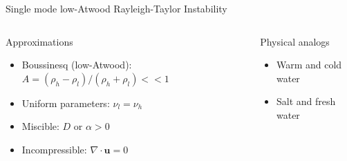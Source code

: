 \documentclass[12pt]{beamer}
\begin{document}
\begin{frame}{Single mode low-Atwood Rayleigh-Taylor Instability}
\begin{columns}[c]

\begin{block}{Approximations}
\begin{itemize}
	\item Boussinesq (low-Atwood): $A =(\rho_h-\rho_l) / (\rho_h+\rho_l) << 1$
  \item Uniform parameters: $\nu_l = \nu_h$
  \item Miscible: $D$ or $\alpha > 0$
  \item Incompressible: $\nabla \cdot \mathbf{u} = 0$
\end{itemize}
\end{block}

\begin{exampleblock}{Physical analogs}
\begin{itemize}
  \item Warm and cold water
  \item Salt and fresh water
\end{itemize}
\end{exampleblock}

\resizebox{!}{0.9\textheight}{}
\end{columns}
\end{frame}
\end{document}
